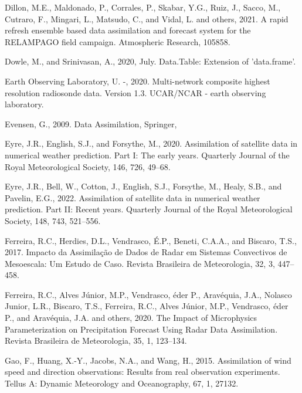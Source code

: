\documentclass[12pt,oneside]{reedthesis}
\begin{document}
\leavevmode\hypertarget{ref-dillon2021}{}%
Dillon, M.E., Maldonado, P., Corrales, P., Skabar, Y.G., Ruiz, J., Sacco, M., Cutraro, F., Mingari, L., Matsudo, C., and Vidal, L. and others, 2021. A rapid refresh ensemble based data assimilation and forecast system for the RELAMPAGO field campaign. Atmospheric Research, 105858.

\leavevmode\hypertarget{ref-dowle2020}{}%
Dowle, M., and Srinivasan, A., 2020, July. Data.Table: Extension of 'data.frame'.

\leavevmode\hypertarget{ref-sondeos}{}%
Earth Observing Laboratory, U. -, 2020. Multi-network composite highest resolution radiosonde data. Version 1.3. UCAR/NCAR - earth observing laboratory.

\leavevmode\hypertarget{ref-evensen2009}{}%
Evensen, G., 2009. Data Assimilation, Springer,

\leavevmode\hypertarget{ref-eyre2020}{}%
Eyre, J.R., English, S.J., and Forsythe, M., 2020. Assimilation of satellite data in numerical weather prediction. Part I: The early years. Quarterly Journal of the Royal Meteorological Society, 146, 726, 49--68.

\leavevmode\hypertarget{ref-eyre2022}{}%
Eyre, J.R., Bell, W., Cotton, J., English, S.J., Forsythe, M., Healy, S.B., and Pavelin, E.G., 2022. Assimilation of satellite data in numerical weather prediction. Part II: Recent years. Quarterly Journal of the Royal Meteorological Society, 148, 743, 521--556.

\leavevmode\hypertarget{ref-ferreira2017}{}%
Ferreira, R.C., Herdies, D.L., Vendrasco, É.P., Beneti, C.A.A., and Biscaro, T.S., 2017. Impacto da Assimilação de Dados de Radar em Sistemas Convectivos de Mesoescala: Um Estudo de Caso. Revista Brasileira de Meteorologia, 32, 3, 447--458.

\leavevmode\hypertarget{ref-ferreira2020}{}%
Ferreira, R.C., Alves Júnior, M.P., Vendrasco, éder P., Aravéquia, J.A., Nolasco Junior, L.R., Biscaro, T.S., Ferreira, R.C., Alves Júnior, M.P., Vendrasco, éder P., and Aravéquia, J.A. and others, 2020. The Impact of Microphysics Parameterization on Precipitation Forecast Using Radar Data Assimilation. Revista Brasileira de Meteorologia, 35, 1, 123--134.

\leavevmode\hypertarget{ref-gao2015}{}%
Gao, F., Huang, X.-Y., Jacobs, N.A., and Wang, H., 2015. Assimilation of wind speed and direction observations: Results from real observation experiments. Tellus A: Dynamic Meteorology and Oceanography, 67, 1, 27132.
\end{document}
